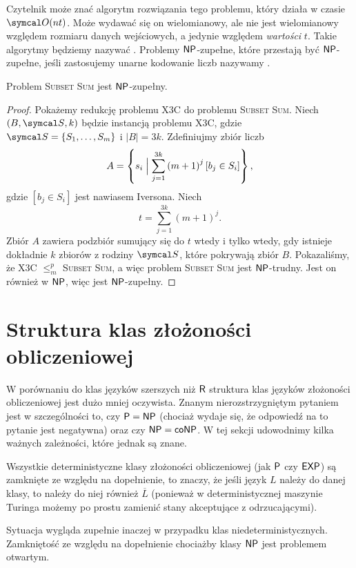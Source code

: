Czytelnik może znać algorytm rozwiązania tego problemu, który działa w czasie $\sO(nt)$. Może wydawać się on wielomianowy, ale nie jest wielomianowy względem rozmiaru danych wejściowych, a jedynie względem \textit{wartości} $t$. Takie algorytmy będziemy nazywać . Problemy $\textsf{NP}$-zupełne, które przestają być $\textsf{NP}$-zupełne, jeśli zastosujemy unarne kodowanie liczb nazywamy .

\begin{theorem}
    Problem \textsc{Subset Sum} jest $\textsf{NP}$-zupełny.
\end{theorem}
\begin{proof}
    Pokażemy redukcję problemu X3C do problemu \textsc{Subset Sum}. Niech $(B, \sS, k)$ będzie instancją problemu X3C, gdzie $\sS = \{S_1, \ldots, S_m\}$ i $|B| = 3k$. Zdefiniujmy zbiór liczb
    \[ A = \left\{s_i \Bigm| \sum_{j=1}^{3k} \left(m + 1\right)^j \left[b_j \in S_i\right]\right\}, \]
    gdzie $\left[b_j \in S_i\right]$ jest nawiasem Iversona. Niech
    \[ t = \sum_{j=1}^{3k} (m + 1)^j. \]
    Zbiór $A$ zawiera podzbiór sumujący się do $t$ wtedy i tylko wtedy, gdy istnieje dokładnie $k$ zbiorów z rodziny $\sS$, które pokrywają zbiór $B$.
    Pokazaliśmy, że X3C $\leq_m^p$ \textsc{Subset Sum}, a więc problem \textsc{Subset Sum} jest $\textsf{NP}$-trudny. Jest on również w $\textsf{NP}$, więc jest $\textsf{NP}$-zupełny.
\end{proof}

\section{Struktura klas złożoności obliczeniowej}

W porównaniu do klas języków szerszych niż $\textsf{R}$ struktura klas języków złożoności obliczeniowej jest dużo mniej oczywista. Znanym nierozstrzygniętym pytaniem jest w szczególności to, czy $\textsf{P} = \textsf{NP}$ (chociaż wydaje się, że odpowiedź na to pytanie jest negatywna) oraz czy $\textsf{NP} = \textsf{coNP}$.
W tej sekcji udowodnimy kilka ważnych zależności, które jednak są znane.

\begin{remark}\label{r:classes closed under complement}
    Wszystkie deterministyczne klasy złożoności obliczeniowej (jak $\textsf{P}$ czy $\textsf{EXP}$) są zamknięte ze względu na dopełnienie, to znaczy, że jeśli język $L$ należy do danej klasy, to należy do niej również $\overline{L}$ (ponieważ w deterministycznej maszynie Turinga możemy po prostu zamienić stany akceptujące z odrzucającymi).

    Sytuacja wygląda zupełnie inaczej w przypadku klas niedeterministycznych. Zamkniętość ze względu na dopełnienie chociażby klasy $\textsf{NP}$ jest problemem otwartym.
\end{remark}

